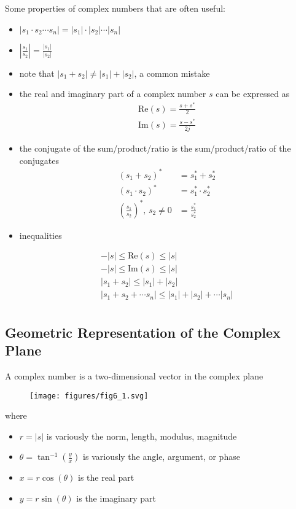 \documentclass{article}
\begin{document}
Some properties of complex numbers that are often useful:

\begin{itemize}
\item $| s_1 \cdot s_2 \cdots s_n| = | s_1| \cdot |s_2| \cdots |s_n|$
\item $\left| \frac{s_1}{s_2} \right| = \frac{|s_1|}{|s_2|}$
\item note that $|s_1 + s_2| \neq |s_1| + |s_2|$, a common mistake
\item the real and imaginary part of a complex number $s$ can be expressed as
  \begin{align}
    \text{Re}(s) = \frac{s+s^*}{2}\\
    \text{Im}(s) = \frac{s-s^*}{2j}
  \end{align}
\item the conjugate of the sum/product/ratio is the sum/product/ratio of the conjugates
  \begin{align}
    (s_1 + s_2)^* &= s_1^* + s_2^*\\
    (s_1 \cdot s_2)^* &= s_1^* \cdot s_2^*\\
    \left(\frac{s_1}{s_2}\right)^*, \, s_2 \neq 0 &= \frac{s_1^*}{s_2^*} 
  \end{align}
\item inequalities

  \begin{align}
    -|s| \leq \text{Re}(s) \leq |s|\\
    -|s| \leq \text{Im}(s) \leq |s|\\
    |s_1 + s_2| \leq |s_1| + |s_2|\\
    |s_1 + s_2 + \cdots s_n| \leq |s_1| + |s_2| + \cdots |s_n|\\
  \end{align}
\end{itemize}

\subsection{Geometric Representation of the Complex Plane}

A complex number is a two-dimensional vector in the complex plane

\begin{figure}
  \centering
  \texttt{[image: figures/fig6\_1.svg]}
\end{figure}

where

\begin{itemize}
\item $r = |s|$ is variously the norm, length, modulus, magnitude
\item $\theta = \tan^{-1}\left(\frac{y}{x}\right) $ is variously the angle, argument, or phase
\item $x = r\cos(\theta)$ is the real part
\item $y = r\sin(\theta)$ is the imaginary part
\end{itemize}
\end{document}
